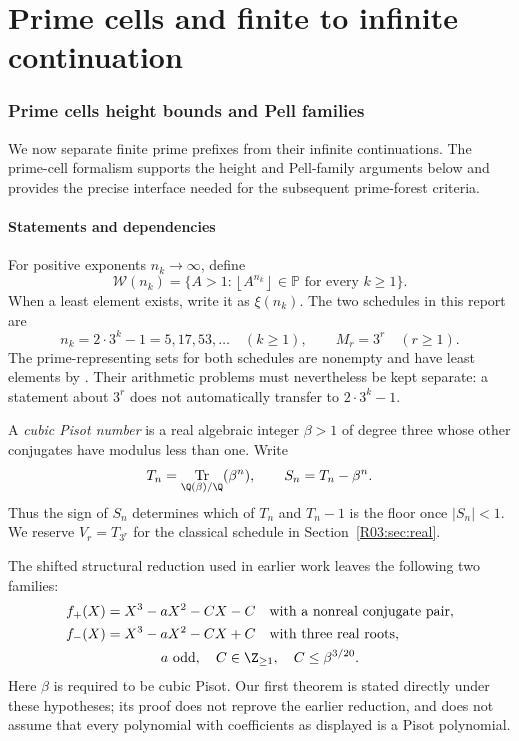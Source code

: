 \documentclass[11pt,a4paper]{article}
\theoremstyle{definition}\newtheorem{definition}[theorem]{Definition}
\theoremstyle{remark}\newtheorem{remark}[theorem]{Remark}
\newcommand{\PP}{\mathbb P}\newcommand{\W}{\mathcal W}\newcommand{\SaitoL}{\mathcal S}
\newcommand{\floor}[1]{\left\lfloor#1\right\rfloor}
\DeclareMathOperator{\Tr}{Tr}\DeclareMathOperator{\tr}{tr}\DeclareMathOperator{\Nm}{N}
\begin{document}
\endgroup

\clearpage\part{Prime cells and finite to infinite continuation}

\section{Prime cells height bounds and Pell families}\label{src:R03}
We now separate finite prime prefixes from their infinite continuations. The prime-cell formalism supports the height and Pell-family arguments below and provides the precise interface needed for the subsequent prime-forest criteria.
\medskip
\begingroup



\subsection{Statements and dependencies}

For positive exponents $n_k\to\infty$, define
\[
 \W(n_k)=\{A>1:\floor{A^{n_k}}\in\PP\text{ for every }k\ge1\}.
\]
When a least element exists, write it as $\xi(n_k)$. The two schedules
in this report are
\begin{equation}\label{R03:eq:clocks}
 n_k=2\cdot3^k-1=5,17,53,\ldots\quad(k\ge1),
 \qquad M_r=3^r\quad(r\ge1).
\end{equation}
The prime-representing sets for both schedules are nonempty and have
least elements by \cite[Theorem~1.3]{Saito}. Their arithmetic problems
must nevertheless be kept separate: a statement about $3^r$ does not
automatically transfer to $2\cdot3^k-1$.

A \emph{cubic Pisot number} is a real algebraic integer $\beta>1$ of
degree three whose other conjugates have modulus less than one. Write
\[
 T_n=\Tr_{\Q(\beta)/\Q}(\beta^n),\qquad
 S_n=T_n-\beta^n.
\]
Thus the sign of $S_n$ determines which of $T_n$ and $T_n-1$ is the
floor once $|S_n|<1$. We reserve $V_r=T_{3^r}$ for the classical
schedule in Section~\ref{R03:sec:real}.

The shifted structural reduction used in earlier work
\cite{K064,N01,R02} leaves the following two families:
\begin{equation}\label{R03:eq:residual}
 \begin{gathered}
 \begin{aligned}
 f_+(X)&=X^3-aX^2-CX-C &&\text{with a nonreal conjugate pair},\\
 f_-(X)&=X^3-aX^2-CX+C &&\text{with three real roots},
 \end{aligned}\\
 a\text{ odd},\quad C\in\Z_{\ge1},\quad C\le\beta^{3/20}.
 \end{gathered}
\end{equation}
Here $\beta$ is required to be cubic Pisot. Our first theorem is
stated directly under these hypotheses; its proof does not reprove
the earlier reduction, and does not assume that every polynomial
with coefficients as displayed is a Pisot polynomial.
\end{document}
